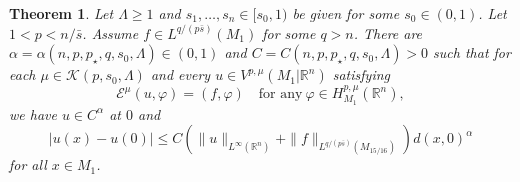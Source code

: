 \documentclass[11pt]{amsart}
\theoremstyle{plain}
\newtheorem{theorem}{Theorem}[section]
\theoremstyle{definition}
\numberwithin{equation}{section}
\newcommand{\R}{\mathbb{R}}
\begin{document}
\begin{theorem} \label{thm:Holder_0}
Let $\Lambda \ge 1$ and $s_1,\dots,s_n\in[s_0,1)$ be given for some $s_0\in(0,1)$. Let $1<p<  n/\bar{s}$. Assume $f\in L^{q/(p\bar{s})}(M_1)$ for some $q>n$. There are $\alpha=\alpha(n,p,p_{\star},q,s_0,\Lambda) \in (0,1)$ and $C=C(n,p,p_{\star},q,s_0,\Lambda) > 0$ such that for each $\mu \in \mathcal{K}(p,s_0,\Lambda)$ and every $u \in V^{p,\mu}(M_1 | \R^n)$ satisfying
\begin{equation*}
\mathcal{E}^\mu(u, \varphi) = (f, \varphi) \quad \text{for any}~ \varphi \in H^{p,\mu}_{M_1}(\R^n),
\end{equation*}
we have $u \in C^\alpha$ at $0$ and
\begin{equation*}
|u(x)-u(0)| \leq C\left( \|u\|_{L^\infty(\R^n)} + \|f\|_{L^{q/(p\bar{s})}(M_{15/16})} \right) d(x,0)^\alpha
\end{equation*}
for all $x \in M_1$.
\end{theorem}
\end{document}
